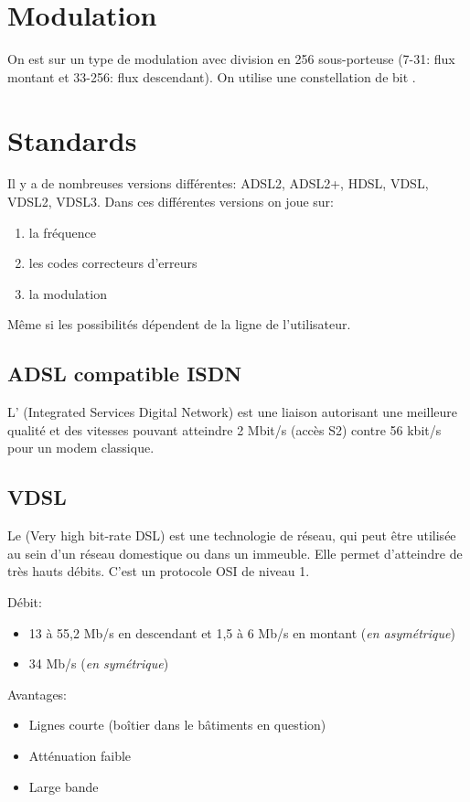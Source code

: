 \section{Modulation}

On est sur un type de modulation  avec division en 256 sous-porteuse (7-31: flux montant et 33-256: flux descendant). On utilise une constellation de bit .

\section{Standards}

Il y a de nombreuses versions différentes: ADSL2, ADSL2+, HDSL, VDSL, VDSL2, VDSL3. Dans ces différentes versions on joue sur:
\begin{enumerate}
\item la fréquence
\item les codes correcteurs d'erreurs
\item la modulation
\end{enumerate}
Même si les possibilités dépendent de la ligne de l'utilisateur.

\subsection{ADSL compatible ISDN}

L' (Integrated Services Digital Network) est une liaison autorisant une meilleure qualité et des vitesses pouvant atteindre 2 Mbit/s (accès S2) contre 56 kbit/s pour un modem classique.

\subsection{VDSL}

Le  (Very high bit-rate DSL) est une technologie de réseau, qui peut être utilisée au sein d'un réseau domestique ou dans un immeuble. Elle permet d'atteindre de très hauts débits. C'est un protocole OSI de niveau 1.

Débit:
\begin{itemize}
\item 13 à 55,2 Mb/s en descendant et 1,5 à 6 Mb/s en montant (\textit{en asymétrique})
\item 34 Mb/s (\textit{en symétrique})
\end{itemize}

Avantages:
\begin{itemize}
\item Lignes courte (boîtier dans le bâtiments en question)
\item Atténuation faible
\item Large bande
\end{itemize}
